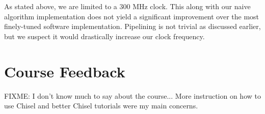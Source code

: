 \documentclass[twocolumn]{article}
\begin{document}
As stated above, we are limited to a 300 MHz clock. This along with our naive algorithm implementation 
does not yield a significant improvement over the most finely-tuned software implementation. Pipelining 
is not trivial as discussed earlier, but we suspect it would drastically increase our clock frequency. 




\section{Course Feedback}

FIXME: I don't know much to say about the course... More instruction on how to use Chisel
and better Chisel tutorials were my main concerns.



\end{document}
